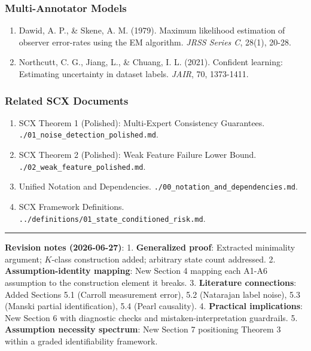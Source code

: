 \documentclass[
  12pt,
]{ctexart}
\providecommand{\tightlist}{%
  \setlength{\itemsep}{0pt}\setlength{\parskip}{0pt}}
\begin{document}
\subsubsection{Multi-Annotator Models}\label{multi-annotator-models}

\begin{enumerate}
\def\labelenumi{\arabic{enumi}.}
\setcounter{enumi}{10}
\tightlist
\item
  Dawid, A. P., \& Skene, A. M. (1979). Maximum likelihood estimation of
  observer error-rates using the EM algorithm. \emph{JRSS Series C},
  28(1), 20-28.
\item
  Northcutt, C. G., Jiang, L., \& Chuang, I. L. (2021). Confident
  learning: Estimating uncertainty in dataset labels. \emph{JAIR}, 70,
  1373-1411.
\end{enumerate}

\subsubsection{Related SCX Documents}\label{related-scx-documents}

\begin{enumerate}
\def\labelenumi{\arabic{enumi}.}
\setcounter{enumi}{12}
\tightlist
\item
  SCX Theorem 1 (Polished): Multi-Expert Consistency Guarantees.
  \texttt{./01\_noise\_detection\_polished.md}.
\item
  SCX Theorem 2 (Polished): Weak Feature Failure Lower Bound.
  \texttt{./02\_weak\_feature\_polished.md}.
\item
  Unified Notation and Dependencies.
  \texttt{./00\_notation\_and\_dependencies.md}.
\item
  SCX Framework Definitions.
  \texttt{../definitions/01\_state\_conditioned\_risk.md}.
\end{enumerate}

\begin{center}\rule{0.5\linewidth}{0.5pt}\end{center}

\textbf{Revision notes (2026-06-27)}: 1. \textbf{Generalized proof}:
Extracted minimality argument; \(K\)-class construction added; arbitrary
state count addressed. 2. \textbf{Assumption-identity mapping}: New
Section 4 mapping each A1-A6 assumption to the construction element it
breaks. 3. \textbf{Literature connections}: Added Sections 5.1 (Carroll
measurement error), 5.2 (Natarajan label noise), 5.3 (Manski partial
identification), 5.4 (Pearl causality). 4. \textbf{Practical
implications}: New Section 6 with diagnostic checks and
mistaken-interpretation guardrails. 5. \textbf{Assumption necessity
spectrum}: New Section 7 positioning Theorem 3 within a graded
identifiability framework.
\end{document}
